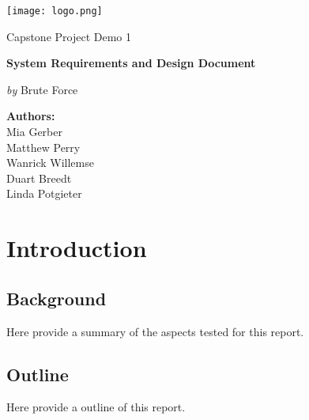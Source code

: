\documentclass[12pt,a4paper]{article}
\begin{document}
    \begin{titlepage}
        {\selectfont
        	\centering
        	\texttt{[image: logo.png]}\par\vspace{1cm}
        	{\LARGE Capstone Project Demo 1 \par}
        	\vspace{0.25cm}
        	{\huge\bfseries \color{cyan}System Requirements and Design Document\par}
        	\vspace{1cm}
        	{\Large\textit{by} Brute Force\par}
            \vspace{0.25cm}

            \par\vspace{1cm}
            \date{}
            \author{}
            \title{}
            \centering
            \textbf{Authors:}\\
            Mia Gerber\\
            Matthew Perry\\
            Wanrick Willemse\\
            Duart Breedt\\
            Linda Potgieter\\
        }
    \end{titlepage}
    \maketitle
    \tableofcontents
    \newpage

    \section{Introduction}
       	\subsection{Background}
            Here provide a summary of the aspects tested for this report.
        \subsection{Outline}
            Here provide a outline of this report.
\end{document}
